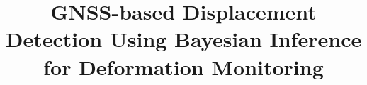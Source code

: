 \documentclass[final,3p,times]{elsarticle}
\begin{document}
	
	\begin{frontmatter}
		
		
		
		\title{GNSS-based Displacement Detection Using Bayesian Inference for Deformation Monitoring}
		
		
	

\end{frontmatter}
\end{document}
